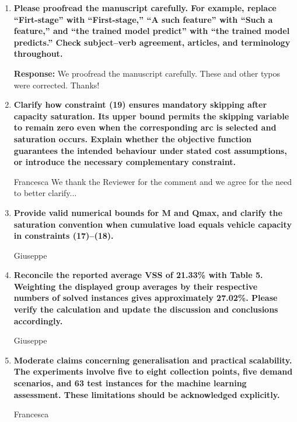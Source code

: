\documentclass[11pt]{article}
\begin{document}
	\begin{enumerate}
	\item \textbf{Please proofread the manuscript carefully. For example, replace “Firt-stage” with “First-stage,”
“A such feature” with “Such a feature,” and “the trained model predict” with “the
trained model predicts.” Check subject–verb agreement, articles, and terminology
throughout.}

	\vspace{1mm}
\noindent\textbf{Response:} We proofread the manuscript carefully. 
These and other typos were corrected. Thanks! 
   
	\item \textbf{Clarify how constraint (19) ensures mandatory skipping after capacity saturation. Its
upper bound permits the skipping variable to remain zero even when the corresponding
arc is selected and saturation occurs. Explain whether the objective function guarantees
the intended behaviour under stated cost assumptions, or introduce the necessary
complementary constraint.} 
	
	\vspace{1mm}
	Francesca
    We thank the Reviewer for the comment and we agree for the need to better clarify... 
	 
	 \item \textbf{Provide valid numerical bounds for M and Qmax, and clarify
the saturation convention when cumulative load equals vehicle capacity in constraints
(17)–(18).}
     
\vspace{1mm}
    Giuseppe
	
	 
	 \item \textbf{Reconcile the reported average VSS of 21.33\% with Table 5. Weighting the displayed
group averages by their respective numbers of solved instances gives approximately
27.02\%. Please verify the calculation and update the discussion and conclusions
accordingly.}
	
	  \vspace{1mm}
Giuseppe
	 
	 \item \textbf{Moderate claims concerning generalisation and practical scalability. The experiments
involve five to eight collection points, five demand scenarios, and 63 test instances for
the machine learning assessment. These limitations should be acknowledged explicitly.}
	 
	 \vspace{1mm}
Francesca
	

\end{enumerate}
\end{document}
